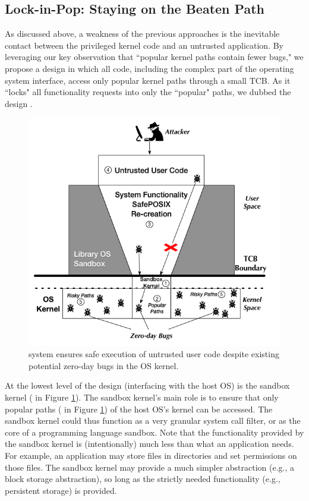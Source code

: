 \subsection{Lock-in-Pop: Staying on the Beaten Path }
As discussed above, a weakness of the previous approaches is the inevitable contact
between the privileged kernel code and an untrusted application.
By leveraging our key observation
that ``popular kernel paths contain fewer bugs," we propose a design
in which all code, including the complex part
of the operating system interface, access only
popular kernel paths through a small TCB. As it ``locks" all functionality
requests into only the ``popular" paths, we dubbed the
design \lip.

\begin{figure}%
\centering
\includegraphics[width=1.0\columnwidth]{diagram/Virtualization_Design_Model_01.png}
\caption{\small \lip system ensures safe execution of untrusted user code
despite existing potential zero-day bugs in the OS kernel.}
\label{fig:design_safe_reimplementation}
\end{figure}

At the lowest level of the design (interfacing with the host OS) is the
sandbox kernel ( in Figure \ref{fig:design_safe_reimplementation}).
The sandbox kernel's main role is to ensure that only popular paths ( in Figure \ref{fig:design_safe_reimplementation})
of the host OS's kernel can be accessed.
The sandbox kernel could thus function as a very granular system call filter, or
as the core of a programming language sandbox. Note that the functionality
provided by the sandbox kernel is (intentionally) much less than what
an application needs. For example, an application may store files in directories and set permissions on those files.
The sandbox kernel may provide a much simpler abstraction (e.g., a block storage abstraction),
so long as the strictly needed functionality (e.g., persistent storage) is provided.

